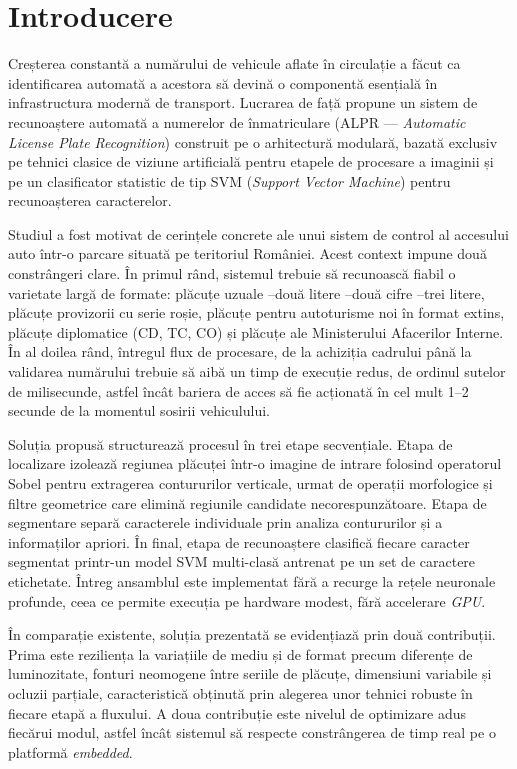 \chapter{Introducere}
\label{intro}
\indent\par
Creșterea constantă a numărului de vehicule aflate în circulație a făcut ca
identificarea automată a acestora să devină o componentă esențială în
infrastructura modernă de transport. Lucrarea de față propune un sistem de
recunoaștere automată a numerelor de înmatriculare (ALPR — \textit{Automatic License
Plate Recognition}) construit pe o arhitectură modulară, bazată exclusiv pe
tehnici clasice de viziune artificială pentru etapele de procesare a imaginii și
pe un clasificator statistic de tip SVM (\textit{Support Vector Machine}) pentru
recunoașterea caracterelor.

Studiul a fost motivat de cerințele concrete ale unui sistem de control al
accesului auto într-o parcare situată pe teritoriul României. Acest context
impune două constrângeri clare. În primul rând, sistemul trebuie să
recunoască fiabil o varietate largă de formate: plăcuțe uzuale
--două litere --două cifre --trei litere, plăcuțe provizorii cu serie roșie, plăcuțe pentru
autoturisme noi în format extins, plăcuțe diplomatice (CD, TC, CO) și plăcuțe
ale Ministerului Afacerilor Interne. În al doilea rând, întregul flux de procesare, de la achiziția cadrului până la validarea
numărului trebuie să aibă un timp de execuție redus, de ordinul sutelor de milisecunde,
astfel încât bariera de acces să fie acționată în cel mult 1--2 secunde de
la momentul sosirii vehiculului.

Soluția propusă structurează procesul în trei etape secvențiale. Etapa de
localizare izolează regiunea plăcuței într-o imagine de intrare folosind
operatorul Sobel pentru extragerea contururilor verticale, urmat de operații
morfologice și filtre geometrice care elimină regiunile candidate
necorespunzătoare. Etapa de segmentare separă caracterele individuale
prin analiza contururilor și a informaților apriori. În final, etapa
de recunoaștere clasifică fiecare caracter segmentat printr-un model SVM
multi-clasă antrenat pe un set de caractere etichetate. Întreg
ansamblul este implementat fără a recurge la rețele neuronale profunde, ceea ce
permite execuția pe hardware modest, fără accelerare \textit{GPU}.

În comparație existente, soluția prezentată se evidențiază prin două
contribuții. Prima este reziliența la variațiile de mediu și de format precum
diferențe de luminozitate, fonturi neomogene între seriile de plăcuțe, dimensiuni
variabile și ocluzii parțiale, caracteristică obținută prin alegerea unor tehnici robuste în
fiecare etapă a fluxului. A doua contribuție este nivelul de optimizare adus
fiecărui modul, astfel încât sistemul să respecte constrângerea de timp real pe
o platformă \textit{embedded}.


